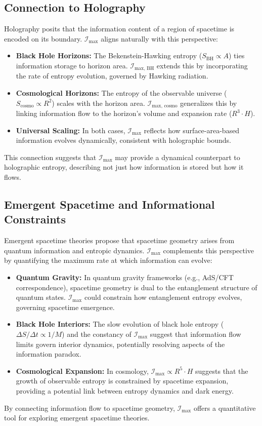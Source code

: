 \documentclass[12pt]{article}
\begin{document}
\subsection{Connection to Holography}
Holography posits that the information content of a region of spacetime is encoded on its boundary. \( \mathcal{I}_{\text{max}} \) aligns naturally with this perspective:
\begin{itemize}
    \item \textbf{Black Hole Horizons:} The Bekenstein-Hawking entropy (\( S_{\text{BH}} \propto A \)) ties information storage to horizon area. \( \mathcal{I}_{\text{max, BH}} \) extends this by incorporating the rate of entropy evolution, governed by Hawking radiation.
    \item \textbf{Cosmological Horizons:} The entropy of the observable universe (\( S_{\text{cosmo}} \propto R^2 \)) scales with the horizon area. \( \mathcal{I}_{\text{max, cosmo}} \) generalizes this by linking information flow to the horizon’s volume and expansion rate (\( R^3 \cdot H \)).
    \item \textbf{Universal Scaling:} In both cases, \( \mathcal{I}_{\text{max}} \) reflects how surface-area-based information evolves dynamically, consistent with holographic bounds.
\end{itemize}
This connection suggests that \( \mathcal{I}_{\text{max}} \) may provide a dynamical counterpart to holographic entropy, describing not just how information is stored but how it flows.

\subsection{Emergent Spacetime and Informational Constraints}
Emergent spacetime theories propose that spacetime geometry arises from quantum information and entropic dynamics. \( \mathcal{I}_{\text{max}} \) complements this perspective by quantifying the maximum rate at which information can evolve:
\begin{itemize}
    \item \textbf{Quantum Gravity:} In quantum gravity frameworks (e.g., AdS/CFT correspondence), spacetime geometry is dual to the entanglement structure of quantum states. \( \mathcal{I}_{\text{max}} \) could constrain how entanglement entropy evolves, governing spacetime emergence.
    \item \textbf{Black Hole Interiors:} The slow evolution of black hole entropy (\( \Delta S / \Delta t \propto 1/M \)) and the constancy of \( \mathcal{I}_{\text{max}} \) suggest that information flow limits govern interior dynamics, potentially resolving aspects of the information paradox.
    \item \textbf{Cosmological Expansion:} In cosmology, \( \mathcal{I}_{\text{max}} \propto R^5 \cdot H \) suggests that the growth of observable entropy is constrained by spacetime expansion, providing a potential link between entropy dynamics and dark energy.
\end{itemize}
By connecting information flow to spacetime geometry, \( \mathcal{I}_{\text{max}} \) offers a quantitative tool for exploring emergent spacetime theories.
\end{document}
